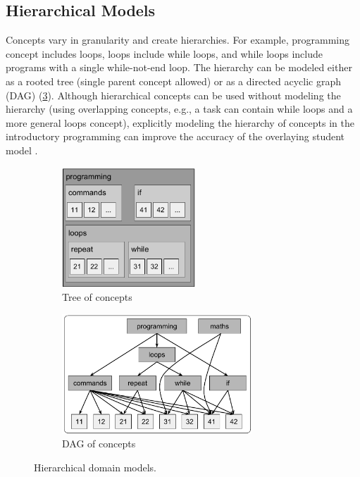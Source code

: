 \subsection{Hierarchical Models}

Concepts vary in granularity and create hierarchies.
For example, programming concept includes loops, loops include while loops,
and while loops include programs with a single while-not-end loop.
The hierarchy can be modeled either as a rooted tree (single parent concept allowed)
or as a directed acyclic graph (DAG) (\cref{fig:concepts-hierarchical}).
Although hierarchical concepts can be used without modeling the hierarchy
(using overlapping concepts, e.g., a task can contain while loops and
a more general loops concept), explicitly modeling the hierarchy of concepts in
the introductory programming can improve the accuracy of the overlaying student model
\cite{learner-models-integration-skills}.


\begin{figure}[htb]
\centering
\begin{subfigure}[t]{0.4\textwidth}
\centering
\includegraphics[height=45mm]{img/concepts-hierarchical-tree}
\caption{Tree of concepts}
\label{fig:concepts-hierarchical-tree}
\end{subfigure}%
\begin{subfigure}[t]{0.6\textwidth}
\centering
\includegraphics[height=45mm]{img/concepts-hierarchical-dag}
\caption{DAG of concepts}
\label{fig:concepts-hierarchical-dag}
\end{subfigure}
\caption{Hierarchical domain models.}
\label{fig:concepts-hierarchical}
\end{figure}


